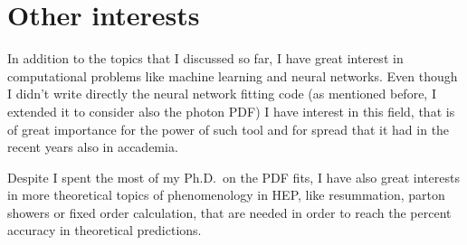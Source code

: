 \documentclass[11pt,a4paper]{moderncv}        %
\begin{document}
\section{Other interests}

In addition to the topics that I discussed so far, I have great interest
in computational problems like machine learning and neural networks.
Even though I didn't write directly the neural network fitting code (as mentioned before, I extended it to consider also the photon PDF)
I have interest in this field, that is of great importance for the power of such tool and for spread that it had in the recent years
also in accademia.

Despite I spent the most of my Ph.D.\ on the PDF fits, I have also great interests in more theoretical topics of phenomenology in HEP,
like resummation, parton showers or fixed order calculation, that are needed in order to reach the percent accuracy in theoretical predictions.



\end{document}
